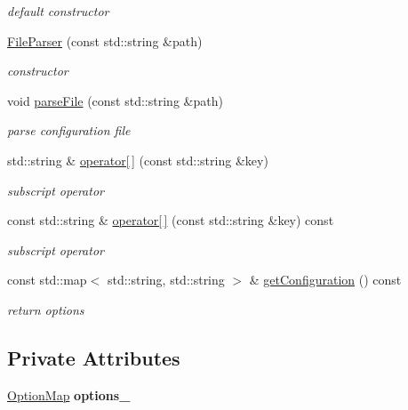 \begin{DoxyCompactItemize}
\begin{DoxyCompactList}\small\item\em default constructor \item\end{DoxyCompactList}\item 
\hyperlink{classFileParser_a85356618e2fba46589474ed5194d0825}{FileParser} (const std::string \&path)
\begin{DoxyCompactList}\small\item\em constructor \item\end{DoxyCompactList}\item 
void \hyperlink{classFileParser_a3ebc2941ae83425b261108a7322b3e3c}{parseFile} (const std::string \&path)
\begin{DoxyCompactList}\small\item\em parse configuration file \item\end{DoxyCompactList}\item 
std::string \& \hyperlink{classFileParser_aec9f5cb1d3f8d520a9a08e1a6c758647}{operator\mbox{[}$\,$\mbox{]}} (const std::string \&key)
\begin{DoxyCompactList}\small\item\em subscript operator \item\end{DoxyCompactList}\item 
const std::string \& \hyperlink{classFileParser_a9ea2f5076226715fc4885afa91f596b1}{operator\mbox{[}$\,$\mbox{]}} (const std::string \&key) const 
\begin{DoxyCompactList}\small\item\em subscript operator \item\end{DoxyCompactList}\item 
const std::map$<$ std::string, std::string $>$ \& \hyperlink{classFileParser_aae45d3086ccf13cc362fc1672a3f9d06}{getConfiguration} () const 
\begin{DoxyCompactList}\small\item\em return options \item\end{DoxyCompactList}\end{DoxyCompactItemize}
\subsection*{Private Attributes}
\begin{DoxyCompactItemize}
\item 
\hypertarget{classFileParser_a0b906d2edd851f1f39dccf425b26f6df}{
\hyperlink{CommonParser_8hpp_ab9159c3df8bcd3d187740f9b123463d6}{OptionMap} {\bfseries options\_\-}}
\label{classFileParser_a0b906d2edd851f1f39dccf425b26f6df}

\end{DoxyCompactItemize}


